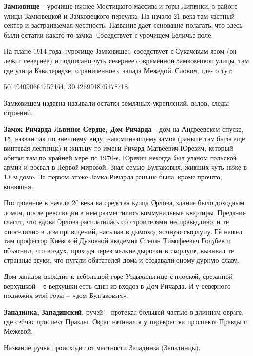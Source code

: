 \newpage

\textbf{Замковище} – урочище южнее Мостицкого массива и горы Липинки, в районе улицы Замковецкой и Замковецкого переулка. На начало 21 века там частный сектор и застраиваемая местность. Название дает основание полагать, что здесь были остатки какого-то замка. Соседствует с урочищем Беличье поле.

На плане 1914 года «урочище Замковище» соседствует с Сукачевым яром (он лежит севернее) и подписано чуть севернее современной Замковецкой улицы, там где улица Кавалеридзе, ограниченное с запада Межедой. Словом, где-то тут:

50.494090664752164, 30.426991875178718

Замковищем издавна называли остатки земляных укреплений, валов, следы строений.\\ 

\medskip

\textbf{Замок Ричарда Львиное Сердце, Дом Ричарда} – дом на Андреевском спуске, 15, назван так по внешнему виду, напоминающему замок (раньше там была еще винтовая лестница) и жильцу по имени Ричард Матвеевич Юревич, который обитал там по крайней мере по 1970-е. Юревич некогда был уланом польской армии и воевал в Первой мировой. Знал семью Булгаковых, живших чуть ниже в 13-м доме. На первом этаже Замка Ричарда раньше была, кроме прочего, конюшня.

Построенное в начале 20 века на средства купца Орлова, здание было доходным домом, после революции в нем разместились коммунальные квартиры. Предание гласит, что вдова Орлова расплатилась со строителями несправедливо, и те «поселили» в дом привидений, насыпав в дымоход яичную скорлупу. Её нашел там профессор Киевской Духовной академии Степан Тимофеевич Голубев и объяснил, что воздух, проходя через мелкие дырочки в скорлупе, вызывал те странные
звуки, что пугали обитателей дома и создавали оному дурную славу.

Дом западом выходит к небольшой горе Уздыхальнице с плоской, срезанной верхушкой – с верхушки есть один из входов в Дом Ричарда. И у северного подножия этой горы – «дом Булгаковых».\\ 

\medskip

\textbf{Западинка, Западинский}, ручей – протекал большей частью в длинном овраге, где сейчас проспект Правды. Овраг начинался у перекрестка проспекта Правды с Межевой.
 
Название ручья происходит от местности Западинка (Западинцы). 

